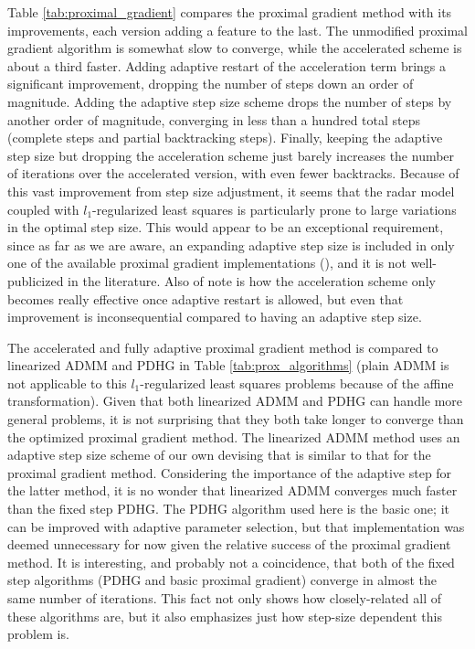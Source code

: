 Table \ref{tab:proximal_gradient} compares the proximal gradient method with its improvements, each version adding a feature to the last. The unmodified proximal gradient algorithm is somewhat slow to converge, while the accelerated scheme is about a third faster. Adding adaptive restart of the acceleration term brings a significant improvement, dropping the number of steps down an order of magnitude. Adding the adaptive step size scheme drops the number of steps by another order of magnitude, converging in less than a hundred total steps (complete steps and partial backtracking steps). Finally, keeping the adaptive step size but dropping the acceleration scheme just barely increases the number of iterations over the accelerated version, with even fewer backtracks. Because of this vast improvement from step size adjustment, it seems that the radar model coupled with $l_1$-regularized least squares is particularly prone to large variations in the optimal step size. This would appear to be an exceptional requirement, since as far as we are aware, an expanding adaptive step size is included in only one of the available proximal gradient implementations (), and it is not well-publicized in the literature. Also of note is how the acceleration scheme only becomes really effective once adaptive restart is allowed, but even that improvement is inconsequential compared to having an adaptive step size.

The accelerated and fully adaptive proximal gradient method is compared to linearized ADMM and PDHG in Table \ref{tab:prox_algorithms} (plain ADMM is not applicable to this $l_1$-regularized least squares problems because of the affine transformation). Given that both linearized ADMM and PDHG can handle more general problems, it is not surprising that they both take longer to converge than the optimized proximal gradient method. The linearized ADMM method uses an adaptive step size scheme of our own devising that is similar to that for the proximal gradient method. Considering the importance of the adaptive step for the latter method, it is no wonder that linearized ADMM converges much faster than the fixed step PDHG. The PDHG algorithm used here is the basic one; it can be improved with adaptive parameter selection, but that implementation was deemed unnecessary for now given the relative success of the proximal gradient method. It is interesting, and probably not a coincidence, that both of the fixed step algorithms (PDHG and basic proximal gradient) converge in almost the same number of iterations. This fact not only shows how closely-related all of these algorithms are, but it also emphasizes just how step-size dependent this problem is.

